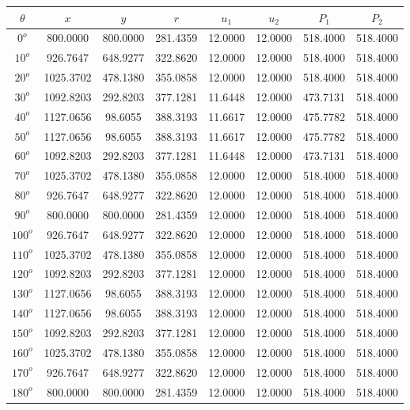 \singlespacing
\begin{table}[H]
    \centering
    \begin{tabular}{|c|c|c|c|c|c|c|c|} \hline
$\theta$ &$x$ &$y$ &$r$ &$u_1$ &$u_2$ &$P_1$ &$P_2$ \\ \hline
$0^o$	&800.0000	&800.0000	&281.4359	&12.0000	&12.0000	&518.4000	&518.4000 \\ \hline
$10^o$	&926.7647	&648.9277	&322.8620	&12.0000	&12.0000	&518.4000	&518.4000 \\ \hline
$20^o$	&1025.3702	&478.1380	&355.0858	&12.0000	&12.0000	&518.4000	&518.4000 \\ \hline
$30^o$	&1092.8203	&292.8203	&377.1281	&11.6448	&12.0000	&473.7131	&518.4000 \\ \hline
$40^o$	&1127.0656	&98.6055	&388.3193	&11.6617	&12.0000	&475.7782	&518.4000 \\ \hline
$50^o$	&1127.0656	&98.6055	&388.3193	&11.6617	&12.0000	&475.7782	&518.4000 \\ \hline
$60^o$	&1092.8203	&292.8203	&377.1281	&11.6448	&12.0000	&473.7131	&518.4000 \\ \hline
$70^o$	&1025.3702	&478.1380	&355.0858	&12.0000	&12.0000	&518.4000	&518.4000 \\ \hline
$80^o$	&926.7647	&648.9277	&322.8620	&12.0000	&12.0000	&518.4000	&518.4000 \\ \hline
$90^o$	&800.0000	&800.0000	&281.4359	&12.0000	&12.0000	&518.4000	&518.4000 \\ \hline
$100^o$	&926.7647	&648.9277	&322.8620	&12.0000	&12.0000	&518.4000	&518.4000 \\ \hline
$110^o$	&1025.3702	&478.1380	&355.0858	&12.0000	&12.0000	&518.4000	&518.4000 \\ \hline
$120^o$	&1092.8203	&292.8203	&377.1281	&12.0000	&12.0000	&518.4000	&518.4000 \\ \hline
$130^o$	&1127.0656	&98.6055	&388.3193	&12.0000	&12.0000	&518.4000	&518.4000 \\ \hline
$140^o$	&1127.0656	&98.6055	&388.3193	&12.0000	&12.0000	&518.4000	&518.4000 \\ \hline
$150^o$	&1092.8203	&292.8203	&377.1281	&12.0000	&12.0000	&518.4000	&518.4000 \\ \hline
$160^o$	&1025.3702	&478.1380	&355.0858	&12.0000	&12.0000	&518.4000	&518.4000 \\ \hline
$170^o$	&926.7647	&648.9277	&322.8620	&12.0000	&12.0000	&518.4000	&518.4000 \\ \hline
$180^o$	&800.0000	&800.0000	&281.4359	&12.0000	&12.0000	&518.4000	&518.4000 \\ \hline

\end{tabular}
\end{table}
